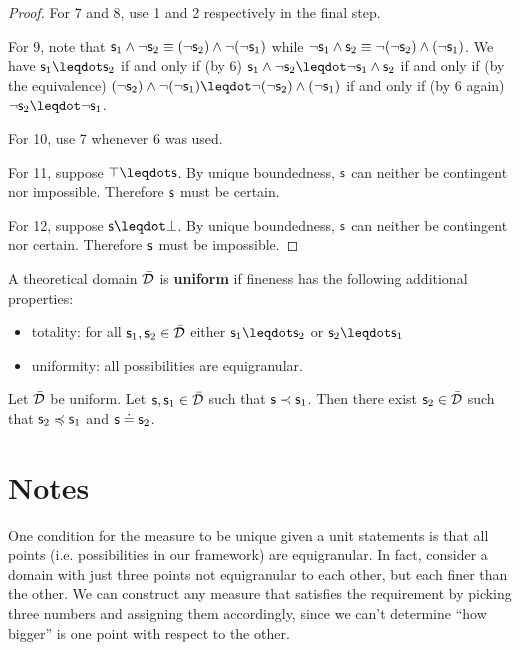 \documentclass{article}
\begin{document}
\begin{proof}
For 7 and 8, use 1 and 2 respectively in the final step.

For 9, note that $\mathsf{s}_1 \wedge \neg \mathsf{s}_2 \equiv (\neg \mathsf{s}_2) \wedge \neg (\neg \mathsf{s}_1)$ while $\neg \mathsf{s}_1 \wedge \mathsf{s}_2 \equiv \neg (\neg \mathsf{s}_2) \wedge (\neg \mathsf{s}_1)$. We have $\stmt_1 \finer \stmt_2$ if and only if (by 6)  $\stmt_1 \AND \NOT \stmt_2 \finer \NOT \stmt_1 \AND \stmt_2$ if and only if (by the equivalence) $(\NOT \stmt_2) \AND \NOT (\NOT \stmt_1) \finer \NOT (\NOT \stmt_2) \AND (\NOT \stmt_1)$ if and only if (by 6 again) $\NOT \stmt_2 \finer \NOT \stmt_1$.

For 10, use 7 whenever 6 was used.

For 11, suppose $\certainty \finer \stmt$. By unique boundedness, $\mathsf{s}$ can neither be contingent nor impossible. Therefore $\mathsf{s}$ must be certain.

For 12, suppose $\stmt \finer \impossibility$. By unique boundedness, $\mathsf{s}$ can neither be contingent nor certain. Therefore $\mathsf{s}$ must be impossible.

\end{proof}

\begin{defn}
    A theoretical domain $\bar{\mathcal{D}}$ is \textbf{uniform} if fineness has the following additional properties:
    \begin{itemize}
        \item totality: for all $\mathsf{s}_1, \mathsf{s}_2 \in \bar{\mathcal{D}}$ either $\stmt_1 \finer \stmt_2$ or $\stmt_2 \finer \stmt_1$
        \item uniformity: all possibilities are equigranular.
    \end{itemize}

\end{defn}

\begin{prop}
    Let $\bar{\mathcal{D}}$ be uniform. Let $\mathsf{s}, \mathsf{s}_1 \in \bar{\mathcal{D}}$ such that $\mathsf{s} \prec \mathsf{s}_1$. Then there exist $\mathsf{s}_2 \in \bar{\mathcal{D}}$ such that $\mathsf{s}_2 \preccurlyeq \mathsf{s}_1$ and $\mathsf{s} \doteq \mathsf{s}_2$.
\end{prop}


\section{Notes}

One condition for the measure to be unique given a unit statements is that all points (i.e. possibilities in our framework) are equigranular. In fact, consider a domain with just three points not equigranular to each other, but each finer than the other. We can construct any measure that satisfies the requirement by picking three numbers and assigning them accordingly, since we can't determine ``how bigger'' is one point with respect to the other.
\end{document}
